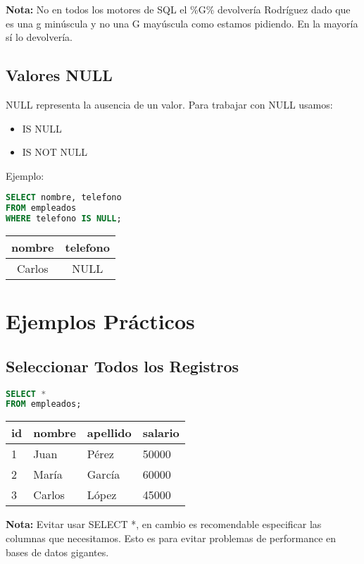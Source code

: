 \documentclass[12pt]{article}
\begin{document}
\textbf{Nota:} No en todos los motores de SQL el \%G\% devolvería Rodríguez dado que es una g minúscula y no una G mayúscula como estamos pidiendo. En la mayoría sí lo devolvería.

\subsection{Valores NULL}
NULL representa la ausencia de un valor. Para trabajar con NULL usamos:
\begin{itemize}
    \item IS NULL
    \item IS NOT NULL
\end{itemize}

Ejemplo:
\begin{lstlisting}[language=SQL]
SELECT nombre, telefono
FROM empleados
WHERE telefono IS NULL;
\end{lstlisting}

\begin{center}
\begin{tabular}{cc}
\toprule
nombre & telefono \\
\midrule
Carlos & NULL \\
\bottomrule
\end{tabular}
\end{center}

\section{Ejemplos Prácticos}
\subsection{Seleccionar Todos los Registros}
\begin{lstlisting}[language=SQL]
SELECT *
FROM empleados;
\end{lstlisting}

\begin{center}
\begin{tabular}{llll}
\toprule
id & nombre & apellido & salario \\
\midrule
1 & Juan & Pérez & 50000 \\
2 & María & García & 60000 \\
3 & Carlos & López & 45000 \\
\bottomrule
\end{tabular}
\end{center}

\textbf{Nota:} Evitar usar SELECT *, en cambio es recomendable especificar las columnas que necesitamos. Esto es para evitar problemas de performance en bases de datos gigantes.
\end{document}
